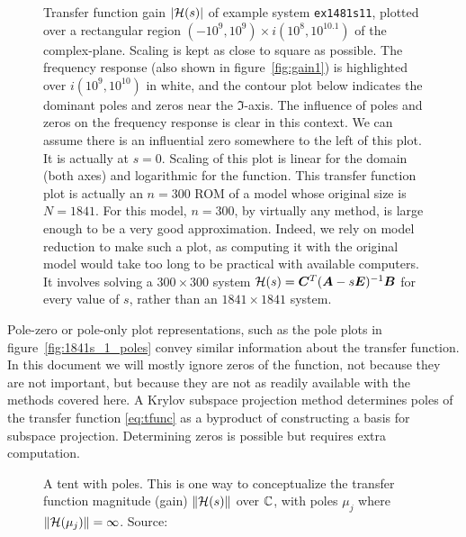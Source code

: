 \begin{figure}[htb]
\centering
{}
\caption{\label{fig:full1841s11}Transfer function gain  $\vert \mathcal{H}(s) \vert$ of example system \texttt{ex1481s11}, plotted over a rectangular region $(-10^{9}, 10^{9}) \times i(10^{8}, 10^{10.1}) $ of the complex-plane.  Scaling is kept as close to square as possible. The frequency response (also shown in figure~\ref{fig:gain1}) is highlighted over $i(10^9, 10^{10})$ in white, and the contour plot below indicates the dominant poles and zeros near the $\Im$-axis.   The influence of poles and zeros on the frequency response is clear in this context. We can assume there is an influential zero somewhere to the left of this plot.  It is actually at $s=0$.    Scaling of this plot is linear for the domain (both axes) and logarithmic for the function. 
This transfer function plot is actually an $n=300$ ROM of a model whose original size is $N=1841$. For this model, $n=300$, by virtually any method, is large enough to be a very good approximation.  Indeed, we rely on model reduction to make such a plot, as computing it with the original model would take too long to be practical with available computers.  It involves solving a $300 \times 300$ system $\mathcal{H}(s)=\bm{C}^T(\bm{A}-s\bm{E})^{-1}\bm{B}$ for every value of $s$, rather than an $1841 \times 1841$ system.}  
\end{figure}



Pole-zero or pole-only plot representations, such as the pole plots in figure~\ref{fig:1841s_1_poles} convey similar information about the transfer function.   In this document we will mostly ignore zeros of the function, not because they are not important, but because they are not as readily available with the methods covered here.   A Krylov subspace projection method determines poles of the transfer function \eqref{eq:tfunc} as a byproduct of  constructing a basis for subspace projection.   Determining zeros is possible but requires extra computation.     

\begin{figure}
\centering
\caption{A tent with poles.  This is one way to conceptualize the transfer function magnitude (gain) $\| \mathcal{H}(s)\|$ over $\mathbb{C}$, with poles $\mu_j$ where $\|\mathcal{H}(\mu_j)\|=\infty$.  Source:\cite{tent_pic_source} }
\label{fig:tent}
\end{figure}

